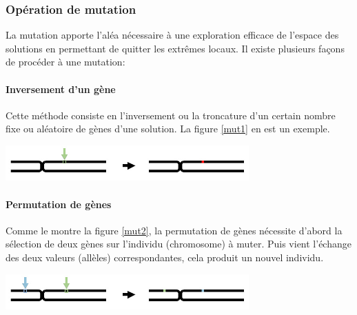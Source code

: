 \subsubsection{Opération de mutation}
La mutation apporte l'aléa nécessaire à une exploration efficace de l'espace des solutions en permettant de quitter les extrêmes locaux.
Il existe plusieurs façons de procéder à une mutation:


\paragraph{Inversement d'un gène}
Cette méthode consiste en l'inversement ou la troncature  d'un certain nombre fixe ou aléatoire de gènes d'une solution. La figure \ref{mut1} en est un exemple.
\begin{center}
	\includegraphics[width=0.7\textwidth]{../Figures/mutation1.jpg}%
	\vspace{-0.3cm}
	\label{mut1}%
\end{center}


\paragraph{Permutation de gènes}
Comme le montre la figure \ref{mut2}, 
la permutation de gènes nécessite d'abord la sélection de deux gènes sur l'individu (chromosome) à muter. Puis vient l'échange des deux valeurs (allèles) correspondantes, cela produit un nouvel individu. 
\begin{center}	
	\includegraphics[width=0.7\textwidth]{../Figures/mutation2.jpg}%
	\vspace{-0.3cm}
	\label{mut2}%
\end{center}




